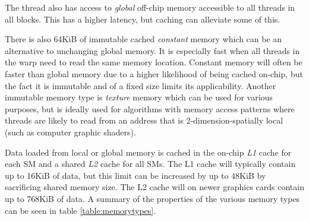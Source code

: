 The thread also has access to \emph{global} off-chip memory accessible to all threads in all blocks.
This has a higher latency, but caching can alleviate some of this.

There is also 64KiB of immutable cached \emph{constant} memory which can be an alternative to unchanging global memory.
It is especially fast when all threads in the warp need to read the same memory location.
Constant memory will often be faster than global memory due to a higher likelihood of being cached on-chip, but the fact it is immutable and of a fixed size limits its applicability.
Another immutable memory type is \emph{texture} memory which can be used for various purposes, but is ideally used for algorithms with memory access patterns where threads are likely to read from an address that is 2-dimension-spatially local (such as computer graphic shaders).

Data loaded from local or global memory is cached in the on-chip \emph{L1} cache for each SM and a shared \emph{L2} cache for all SMs.
The L1 cache will typically contain up to 16KiB of data, but this limit can be increased by up to 48KiB by sacrificing shared memory size.
The L2 cache will on newer graphics cards contain up to 768KiB of data.
A summary of the properties of the various memory types can be seen in table \ref{table:memorytypes}.

\begin{table}[H]
\centering
{}
\caption{Properties of CUDA memory types\label{table:memorytypes}}
\end{table}

